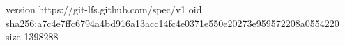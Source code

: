 version https://git-lfs.github.com/spec/v1
oid sha256:a7c4e7ffc6794a4bd916a13acc14fc4e0371e550e20273e959572208a0554220
size 1398288
